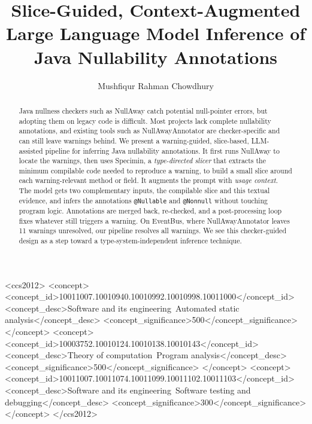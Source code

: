 \documentclass[sigplan,screen]{acmart}
\begin{document}
\title[Slice-Guided, Context-Augmented Large Language Model Inference \ldots]{
  Slice-Guided, Context-Augm\-ented Large Language Model Inference of Java Nullability Annotations}

\author{Mushfiqur Rahman Chowdhury}

\begin{abstract}
Java nullness checkers such as NullAway catch potential null-pointer errors, but adopting them on legacy code is difficult. Most projects lack complete nullability annotations, and existing tools such as NullAwayAnnotator are checker-specific and can still leave warnings behind. We present a warning-guided, slice-based, LLM-assisted pipeline for inferring Java nullability annotations. It first runs NullAway to locate the warnings, then uses Specimin, a \emph{type-directed slicer} that extracts the minimum compilable code needed to reproduce a warning, to build a small slice around each warning-relevant method or field. It augments the prompt with \emph{usage context}. The model gets two complementary inputs, the compilable slice and this textual evidence, and infers the annotations \texttt{@Nullable} and \texttt{@Nonnull} without touching program logic. Annotations are merged back, re-checked, and a  post-processing loop fixes whatever still triggers a warning. On EventBus, where NullAwayAnnotator leaves 11 warnings unresolved, our pipeline resolves all warnings. We see this checker-guided design as a step toward a type-system-independent inference technique.
\end{abstract}

\begin{CCSXML}
<ccs2012>
<concept>
<concept_id>10011007.10010940.10010992.10010998.10011000</concept_id>
<concept_desc>Software and its engineering~Automated static analysis</concept_desc>
<concept_significance>500</concept_significance>
</concept>
<concept>
<concept_id>10003752.10010124.10010138.10010143</concept_id>
<concept_desc>Theory of computation~Program analysis</concept_desc>
<concept_significance>500</concept_significance>
</concept>
<concept>
<concept_id>10011007.10011074.10011099.10011102.10011103</concept_id>
<concept_desc>Software and its engineering~Software testing and debugging</concept_desc>
<concept_significance>300</concept_significance>
</concept>
</ccs2012>
\end{CCSXML}
\end{document}
